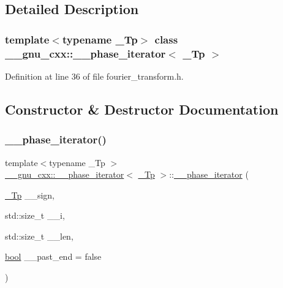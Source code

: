 \subsection{Detailed Description}
\subsubsection*{template$<$typename \+\_\+\+Tp$>$\newline
class \+\_\+\+\_\+gnu\+\_\+cxx\+::\+\_\+\+\_\+phase\+\_\+iterator$<$ \+\_\+\+Tp $>$}



Definition at line 36 of file fourier\+\_\+transform.\+h.



\subsection{Constructor \& Destructor Documentation}
\mbox{\label{class____gnu__cxx_1_1____phase__iterator_af39f5fc7df3ea01a383f9bc7345b2330}} 
\subsubsection{\texorpdfstring{\+\_\+\+\_\+phase\+\_\+iterator()}{\_\_phase\_iterator()}\hspace{0.1cm}{\footnotesize\ttfamily [1/2]}}
{\footnotesize\ttfamily template$<$typename \+\_\+\+Tp $>$ \\
\hyperlink{class____gnu__cxx_1_1____phase__iterator}{\+\_\+\+\_\+gnu\+\_\+cxx\+::\+\_\+\+\_\+phase\+\_\+iterator}$<$ \hyperlink{namespace____gnu__cxx_a3b19a9c800ca194374ef9172290f7d79}{\+\_\+\+Tp} $>$\+::\hyperlink{class____gnu__cxx_1_1____phase__iterator}{\+\_\+\+\_\+phase\+\_\+iterator} (\begin{DoxyParamCaption}\item[{\hyperlink{namespace____gnu__cxx_a3b19a9c800ca194374ef9172290f7d79}{\+\_\+\+Tp}}]{\+\_\+\+\_\+sign,  }\item[{std\+::size\+\_\+t}]{\+\_\+\+\_\+i,  }\item[{std\+::size\+\_\+t}]{\+\_\+\+\_\+len,  }\item[{\hyperlink{namespace____gnu__cxx_ae83aca57f97767d5d09188718728a0ac}{bool}}]{\+\_\+\+\_\+past\+\_\+end = {\ttfamily false} }\end{DoxyParamCaption})\hspace{0.3cm}{\ttfamily [inline]}}



